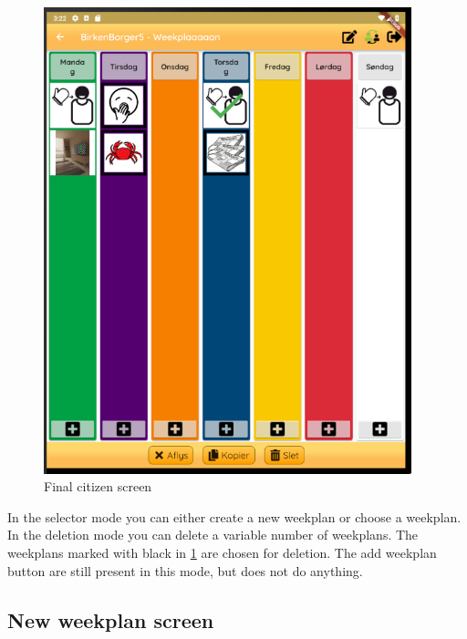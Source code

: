\begin{figure}[H]
    \begin{center}
        \includegraphics[width=0.95\textwidth]{figures/FinalScreen/editWeekplanScreen.png}
    \end{center}
    \caption{Final citizen screen}
    \label{fig:finalEditWeekplanSelector}
\end{figure}

In the selector mode you can either create a new weekplan or choose a weekplan. In the deletion mode you can delete a variable number of weekplans. The weekplans marked with black in \ref{fig:finalEditWeekplanSelector} are chosen for deletion. The add weekplan button are still present in this mode, but does not do anything. 

\subsection{New weekplan screen}

